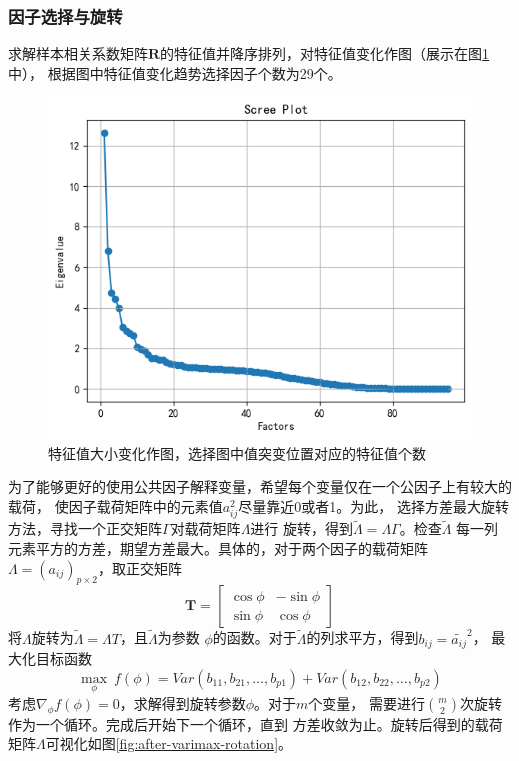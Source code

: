 \subsubsection{因子选择与旋转}
求解样本相关系数矩阵$\bm{R}$的特征值并降序排列，对特征值变化作图（展示在图\ref{fig:scree-plot}中），
根据图中特征值变化趋势选择因子个数为29个。
\begin{figure}[ht]
    \centering
    \includegraphics[width=.6\textwidth]{images/scree_plot.png}
    \caption{特征值大小变化作图，选择图中值突变位置对应的特征值个数}
    \label{fig:scree-plot}
\end{figure}
\par 为了能够更好的使用公共因子解释变量，希望每个变量仅在一个公因子上有较大的载荷，
使因子载荷矩阵中的元素值$a_{ij}^2$尽量靠近0或者1。为此，
选择方差最大旋转方法，寻找一个正交矩阵$\Gamma$对载荷矩阵$\Lambda$进行
旋转，得到$\tilde{\Lambda}=\Lambda\Gamma$。检查$\tilde{\Lambda}$
每一列元素平方的方差，期望方差最大。具体的，对于两个因子的载荷矩阵
$\Lambda = (a_{ij})_{p\times 2}$，取正交矩阵
\begin{equation*}
    \bm{T} =\left[
    \begin{array}{cc}
        \cos\phi & -\sin\phi \\
        \sin\phi & \cos\phi
    \end{array}
    \right]
\end{equation*}
将$\Lambda$旋转为$\tilde{\Lambda}=\Lambda T$，且$\tilde{\Lambda}$为参数
$\phi$的函数。对于$\tilde{\Lambda}$的列求平方，得到$b_{ij}=\tilde{a_{ij}}^2$，
最大化目标函数
\begin{equation*}
\max_{\phi} \ f(\phi)=Var(b_{11},b_{21},\ldots,b_{p1}) + Var(b_{12},b_{22},\ldots,b_{p2})
\end{equation*}
考虑$\nabla_{\phi}f(\phi)=0$，求解得到旋转参数$\phi$。对于$m$个变量，
需要进行$\binom{m}{2}$次旋转作为一个循环。完成后开始下一个循环，直到
方差收敛为止。旋转后得到的载荷矩阵$\Lambda$可视化如图\ref{fig:after-varimax-rotation}。
